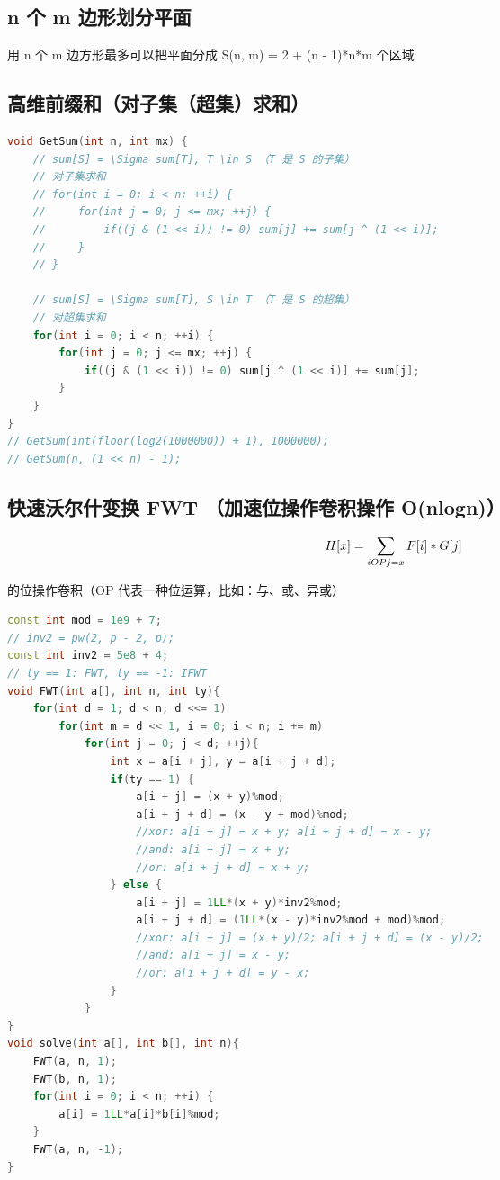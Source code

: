 \subsection{n 个 m 边形划分平面}

用 n 个 m 边方形最多可以把平面分成 S(n, m) = 2 + (n - 1)*n*m 个区域

\subsection{高维前缀和（对子集（超集）求和）}

\begin{lstlisting}[language=C++]
void GetSum(int n, int mx) {
    // sum[S] = \Sigma sum[T], T \in S （T 是 S 的子集）
    // 对子集求和
    // for(int i = 0; i < n; ++i) {
    //     for(int j = 0; j <= mx; ++j) {
    //         if((j & (1 << i)) != 0) sum[j] += sum[j ^ (1 << i)];
    //     }
    // }

    // sum[S] = \Sigma sum[T], S \in T （T 是 S 的超集）
    // 对超集求和
    for(int i = 0; i < n; ++i) {
        for(int j = 0; j <= mx; ++j) {
            if((j & (1 << i)) != 0) sum[j ^ (1 << i)] += sum[j];
        }
    }
}
// GetSum(int(floor(log2(1000000)) + 1), 1000000);
// GetSum(n, (1 << n) - 1);
\end{lstlisting}

\subsection{快速沃尔什变换 FWT （加速位操作卷积操作 O(nlogn)）}

$$H[x] = \sum \limits _ {i \space OP \space j = x} F[i]*G[j]$$

的位操作卷积（OP 代表一种位运算，比如：与、或、异或）

\begin{lstlisting}[language=C++]
const int mod = 1e9 + 7;
// inv2 = pw(2, p - 2, p);
const int inv2 = 5e8 + 4; 
// ty == 1: FWT, ty == -1: IFWT
void FWT(int a[], int n, int ty){  
    for(int d = 1; d < n; d <<= 1)  
        for(int m = d << 1, i = 0; i < n; i += m)  
            for(int j = 0; j < d; ++j){  
                int x = a[i + j], y = a[i + j + d];  
                if(ty == 1) {
                    a[i + j] = (x + y)%mod;
                    a[i + j + d] = (x - y + mod)%mod;  
                    //xor: a[i + j] = x + y; a[i + j + d] = x - y;  
                    //and: a[i + j] = x + y;
                    //or: a[i + j + d] = x + y;
                } else {
                    a[i + j] = 1LL*(x + y)*inv2%mod;
                    a[i + j + d] = (1LL*(x - y)*inv2%mod + mod)%mod;
                    //xor: a[i + j] = (x + y)/2; a[i + j + d] = (x - y)/2;
                    //and: a[i + j] = x - y;
                    //or: a[i + j + d] = y - x;
                }
            }  
}
void solve(int a[], int b[], int n){  
    FWT(a, n, 1);
    FWT(b, n, 1);
    for(int i = 0; i < n; ++i) {
        a[i] = 1LL*a[i]*b[i]%mod;
    }  
    FWT(a, n, -1);
}
\end{lstlisting}

